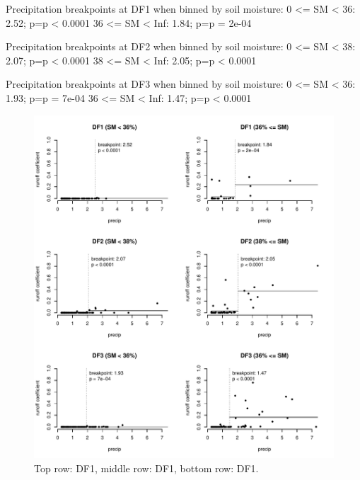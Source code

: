 \documentclass[12pt]{article}
\begin{document}
\begin{Schunk}
\begin{Soutput}
Precipitation breakpoints at DF1 when binned by soil moisture:
0 <= SM < 36: 2.52; p=p < 0.0001
36 <= SM < Inf: 1.84; p=p = 2e-04

Precipitation breakpoints at DF2 when binned by soil moisture:
0 <= SM < 38: 2.07; p=p < 0.0001
38 <= SM < Inf: 2.05; p=p < 0.0001

Precipitation breakpoints at DF3 when binned by soil moisture:
0 <= SM < 36: 1.93; p=p = 7e-04
36 <= SM < Inf: 1.47; p=p < 0.0001
\end{Soutput}
\end{Schunk}





\begin{figure}
    \begin{center}
\includegraphics{runoff_constants-precip_binned}
    \end{center}
    \caption{Top row: DF1, middle row: DF1, bottom row: DF1.\label{precip_binned}}
\end{figure}
\end{document}
